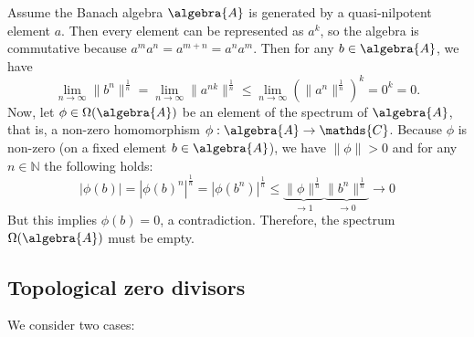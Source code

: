 \documentclass[a4paper]{article}
\begin{document}
Assume the Banach algebra $\algebra{A}$ is generated by a quasi-nilpotent element $a$.
Then every element can be represented as $a^k$, so the algebra is commutative because $a^m a^n = a^{m + n} = a^n a^m$.
Then for any $b \in \algebra{A}$, we have
\begin{equation*}
    \lim_{n \to \infty} \|b^n\|^\frac{1}{n} = \lim_{n \to \infty} \|a^{nk}\|^\frac{1}{n} \leq \lim_{n \to \infty} (\|a^n\|^\frac{1}{n})^k = 0^k = 0\text{.}
\end{equation*}
Now, let $\phi \in \Omega(\algebra{A})$ be an element of the spectrum of $\algebra{A}$, that is, a non-zero homomorphism $\phi: \algebra{A} \to \mathds{C}$. Because $\phi$ is non-zero (on a fixed element $b \in \algebra{A}$), we have $\|\phi\| > 0$ and for any $n \in \mathds{N}$ the following holds:
\begin{equation*}
    |\phi(b)| = |\phi(b)^{n}|^{\frac{1}{n}} = |\phi(b^n)|^\frac{1}{n} \leq \underbrace{\|\phi\|^{\frac{1}{n}}}_{\to 1} \underbrace{\|b^n\|^\frac{1}{n}}_{\to 0} \to 0 
\end{equation*}
But this implies $\phi(b) = 0$, a contradiction.
Therefore, the spectrum $\Omega(\algebra{A})$ must be empty.


\setcounter{subsection}{8}
\subsection{Topological zero divisors}

We consider two cases:
\end{document}
